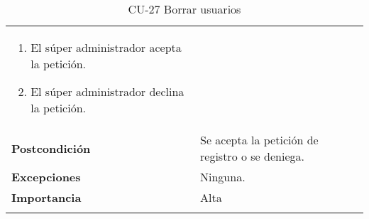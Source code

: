 \begin{longtable}[t]{@{}ll@{}}
\begin{minipage}[t]{0.71\columnwidth}
\begin{enumerate}
\begin{enumerate}
    \item El súper administrador acepta la petición.
    \item El súper administrador declina la petición.
\end{enumerate}
\end{enumerate}\strut
\end{minipage}\tabularnewline
\begin{minipage}[t]{0.23\columnwidth}\raggedright\strut
\textbf{Postcondición}\strut
\end{minipage} & \begin{minipage}[t]{0.71\columnwidth}\raggedright\strut
Se acepta la petición de registro o se deniega.\strut
\end{minipage}\tabularnewline
\begin{minipage}[t]{0.23\columnwidth}\raggedright\strut
\textbf{Excepciones}\strut
\end{minipage} & \begin{minipage}[t]{0.71\columnwidth}\raggedright\strut
Ninguna. \strut
\end{minipage}\tabularnewline
\begin{minipage}[t]{0.23\columnwidth}\raggedright\strut
\textbf{Importancia}\strut
\end{minipage} & \begin{minipage}[t]{0.71\columnwidth}\raggedright\strut
Alta\strut
\end{minipage}\tabularnewline
\bottomrule
\caption{CU-27 Borrar usuarios}
\end{longtable}

